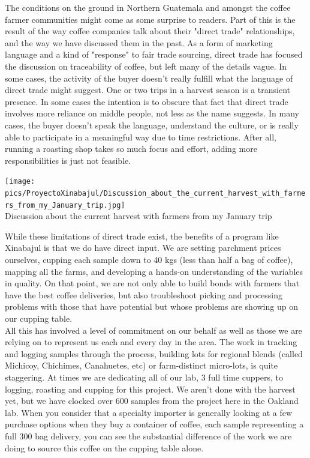 \documentclass[10pt,twoside,footinclude=true,headinclude=true]{scrbook} %
\begin{document}
The conditions on the ground in Northern Guatemala and amongst the coffee farmer communities might come as some surprise to readers. Part of this is the result of the way coffee companies talk about their "direct trade" relationships, and the way we have discussed them in the past. As a form of marketing language and a kind of "response" to fair trade sourcing,
direct trade has focused the discussion on traceability of coffee, but left many of the details vague. In some cases, the activity of the buyer
doesn't really fulfill what the language of direct trade might suggest. One or two trips in a harvest season is a transient presence. In some cases the intention is to obscure that fact that direct trade involves more reliance on middle people, not less as the name suggests. In many cases, the buyer doesn't speak the language, understand the culture, or is really able to participate in a meaningful way due to time restrictions. After all, running a roasting shop takes so much focus and effort, adding more responsibilities is just not feasible.\\
\begin{center}
	\texttt{[image: pics/ProyectoXinabajul/Discussion\_about\_the\_current\_harvest\_with\_farmers\_from\_my\_January\_trip.jpg]} \\
	\scriptsize
	Discussion about the current harvest with farmers from my January trip
\end{center}
While these limitations of direct trade exist, the benefits of a program like Xinabajul is that we do have direct input.  We are setting parchment prices ourselves, cupping each sample down to 40 kgs (less than half a bag
of coffee), mapping all the farms, and developing a hands-on understanding of the variables in quality. On that point, we are not only able to build bonds with farmers that have the best coffee deliveries, but also troubleshoot picking and processing problems with those that have potential but whose problems are showing up on our cupping table.\\
\medskip
All this has involved a level of commitment on our behalf as well as those we are relying on to represent us each and every day in the area. The work in tracking and logging samples through the process, building lots for regional blends (called Michicoy, Chichimes, Canahuetes, etc) or
farm-distinct micro-lots, is quite staggering. At times we are dedicating all of our lab, 3 full time cuppers, to logging, roasting and cupping for this project. We aren't done with the harvest yet, but we have clocked over 600 samples from the project here in the Oakland lab. When you consider that a specialty importer is generally looking at a few purchase options when they buy a container of coffee, each sample representing a full 300 bag delivery, you can see the substantial difference of the work we are doing to source this coffee on the cupping table alone.\\
\end{document}
